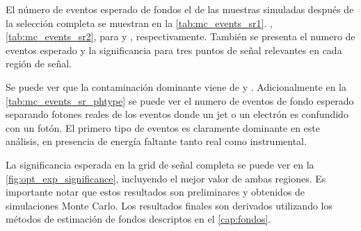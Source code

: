 El número de eventos esperado de fondos el {\SM} de las muestras simuladas
después de la selección completa se muestran en la \cref{tab:mc_events_sr1}.
,\ref{tab:mc_events_sr2}, para {\SRL} y {\SRH}, respectivamente.
También se presenta el numero de eventos esperado y la significancia para tres puntos
de señal relevantes en cada región de señal.

Se puede ver que la contaminación dominante viene de {\wgam} y {\ttgam}. Adicionalmente
en la \cref{tab:mc_events_sr_phtype} se puede ver el numero de eventos de fondo
esperado separando fotones reales de los eventos donde un jet o un electrón es confundido
con un fotón. El primero tipo de eventos es claramente dominante en este análisis, en
presencia de energía faltante tanto real como instrumental.

La significancia esperada en la grid de señal completa se puede ver en la \cref{fig:opt_exp_significance},
incluyendo el mejor valor de ambas regiones. Es importante notar que estos
resultados son preliminares y obtenidos de simulaciones Monte Carlo. Los resultados
finales son derivados utilizando los métodos de estimación de fondos descriptos en
el \cref{cap:fondos}. %

